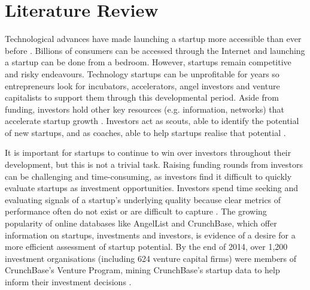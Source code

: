 \documentclass[../thesis/thesis.tex]{subfiles}
\begin{document}

\chapter{Literature Review}
\label{chap:litreview}



Technological advances have made launching a startup more accessible than ever before \cite{tweney2015}. Billions of consumers can be accessed through the Internet and launching a startup can be done from a bedroom. However, startups remain competitive and risky endeavours. Technology startups can be unprofitable for years so entrepreneurs look for incubators, accelerators, angel investors and venture capitalists to support them through this developmental period. Aside from funding, investors hold other key resources (e.g. information, networks) that accelerate startup growth \cite{croce2013}. Investors act as scouts, able to identify the potential of new startups, and as coaches, able to help startups realise that potential \cite{baum2004}.

It is important for startups to continue to win over investors throughout their development, but this is not a trivial task. Raising funding rounds from investors can be challenging and time-consuming, as investors find it difficult to quickly evaluate startups as investment opportunities. Investors spend time seeking and evaluating signals of a startup's underlying quality because clear metrics of performance often do not exist or are difficult to capture \cite{shane2002}. The growing popularity of online databases like AngelList and CrunchBase, which offer information on startups, investments and investors, is evidence of a desire for a more efficient assessment of startup potential. By the end of 2014, over 1,200 investment organisations (including 624 venture capital firms) were members of CrunchBase's Venture Program, mining CrunchBase's startup data to help inform their investment decisions \cite{patil2015}.
\end{document}
